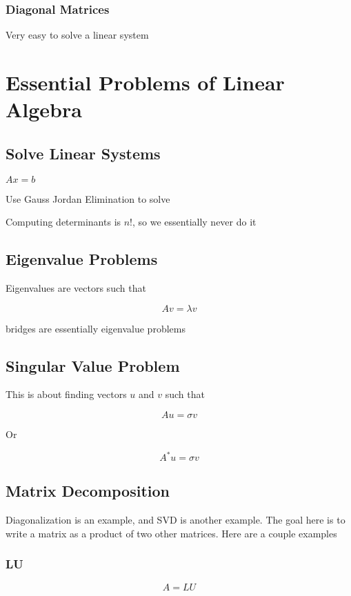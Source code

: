 \documentclass{article}
\begin{document}
\subsubsection{Diagonal Matrices}
Very easy to solve a linear system

\section{Essential Problems of Linear Algebra}

\subsection{Solve Linear Systems}

$Ax = b$

Use Gauss Jordan Elimination to solve

Computing determinants is $n!$, so we essentially never do it


\subsection{Eigenvalue Problems}

Eigenvalues are vectors such that

$$Av = \lambda v$$

bridges are essentially eigenvalue problems

\subsection{Singular Value Problem}

This is about finding vectors $u$ and $v$ such that

$$Au = \sigma v$$

Or

$$A^*u = \sigma v$$


\subsection{Matrix Decomposition}
Diagonalization is an example, and SVD is another example.  The goal here is to write a matrix as a product of two other matrices. Here are a couple examples

\subsubsection{LU}

$$A = LU$$
\end{document}
